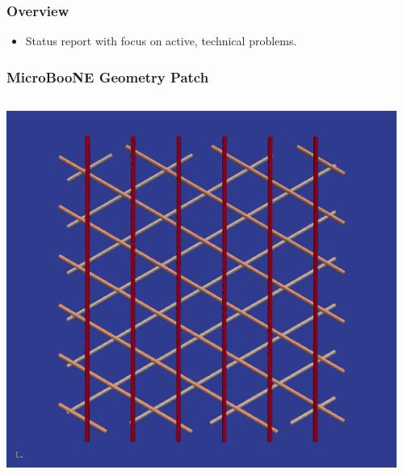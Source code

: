 \documentclass[xcolor=dvipsnames]{beamer}
\begin{document}



\begin{frame}
  \frametitle{Overview}
  \begin{itemize}
  \item Status report with focus on active, technical problems.
  \end{itemize}
\end{frame}


\begin{frame}
  \frametitle{MicroBooNE Geometry Patch}

  \begin{columns}
    \begin{column}{0.5\textwidth}
      \begin{center}
        \includegraphics[width=\textwidth]{wires-flat.png}
      \end{center}
    \end{column}
    \begin{column}{0.5\textwidth}
      \begin{center}

\end{center}
\end{column}
\end{columns}
\end{frame}
\end{document}
